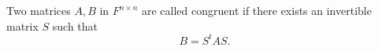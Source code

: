 Two matrices $A, B$ in $F^{n \times n}$ are called congruent if there exists an invertible matrix $S$ such that
$$B = S^t A S.$$
